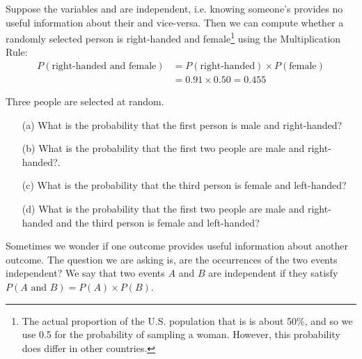Suppose the variables  and
 are independent,
i.e. knowing someone's  provides no useful
information about their  and vice-versa.
Then we can compute whether a randomly selected person is
right-handed and female\footnote{The actual proportion of
  the U.S. population that is  is about 50\%,
  and so we use 0.5 for the probability of sampling a woman.
  However, this probability does differ in other countries.}
using the Multiplication Rule:
\begin{align*}
P(\text{right-handed and female})
    &= P(\text{right-handed}) \times  P(\text{female}) \\
    &= 0.91 \times  0.50 = 0.455
\end{align*}


\begin{exercisewrap}
\begin{nexercise}
Three people are selected at random.\footnotemark \vspace{-1.5mm}
\begin{enumerate}
\setlength{\itemsep}{0mm}
\item[(a)] What is the probability that the first person is male and right-handed?
\item[(b)] What is the probability that the first two people are male and right-handed?.
\item[(c)] What is the probability that the third person is female and left-handed?
\item[(d)] What is the probability that the first two people are male and right-handed and the third person is female and left-handed?
\end{enumerate}
\end{nexercise}
\end{exercisewrap}

Sometimes we wonder if one outcome provides useful information about another outcome. The question we are asking is, are the occurrences of the two events independent? We say that two events $A$ and $B$ are independent if they satisfy
$P(A \text{ and }B) = P(A) \times  P(B)$.


